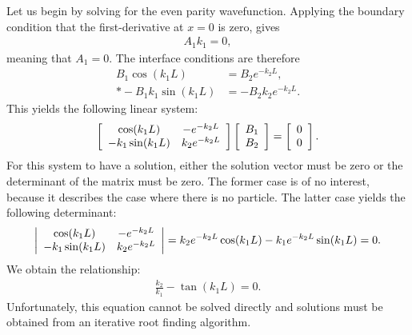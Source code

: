 Let us begin by solving for the even parity wavefunction. Applying the boundary condition that the first-derivative at $x = 0$ is zero, gives
\begin{align}
  A_1 k_1 = 0,
\end{align}
meaning that $A_1 = 0$. The interface conditions are therefore
\begin{subequations}
\begin{align}
  B_1 \cos ( k_1 L ) &= B_2 e^{-k_2 L}, \\*
  - B_1 k_1 \sin ( k_1 L ) &= -B_2 k_2 e^{-k_2 L} .
\end{align}
\end{subequations}
This yields the following linear system:
\begin{align}
  \left[ \begin{array}{c c}
       \cos( k_1 L ) &     -e^{-k_2 L} \\
  -k_1 \sin( k_1 L ) &  k_2 e^{-k_2 L} \\ \end{array} \right]
  \left[ \begin{array}{c} B_1 \\ B_2 \\ \end{array} \right] =
  \left[ \begin{array}{c} 0 \\ 0 \\ \end{array} \right] .
\end{align}
For this system to have a solution, either the solution vector must be zero or the determinant of the matrix must be zero. The former case is of no interest, because it describes the case where there is no particle. The latter case yields the following determinant:
\begin{align}
  \left| \begin{array}{c c}
       \cos( k_1 L ) &     -e^{-k_2 L} \\
  -k_1 \sin( k_1 L ) &  k_2 e^{-k_2 L} \\ \end{array} \right| = k_2  e^{-k_2 L} \cos( k_1 L ) - k_1 e^{-k_2 L} \sin( k_1 L ) = 0.
\end{align}
We obtain the relationship:
\begin{align}
  \frac{k_2}{k_1} - \tan ( k_1 L ) = 0.
\end{align}
Unfortunately, this equation cannot be solved directly and solutions must be obtained from an iterative root finding algorithm. 

